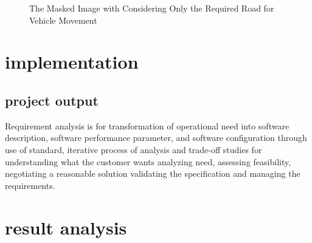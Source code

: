 \documentclass[oneside,a4paper,12pt]{report}
\begin{document}
\begin{center}
\begin{enumerate}
\begin{center}
\end{center}
\begin{center}
\begin{figure}[!htbp]
\caption{The Masked Image with Considering Only the Required Road for Vehicle Movement}
\end{figure}
\end{center}
\chapter{implementation}
\section{project output}
Requirement analysis is for transformation of operational need into software description, software performance parameter, and software configuration through use of standard, iterative process of analysis and trade-off studies for understanding what the customer wants analyzing need, assessing feasibility, negotiating a reasonable solution validating the specification and managing the requirements.
\chapter{result analysis}







\end{enumerate}
\end{center}
\end{document}
